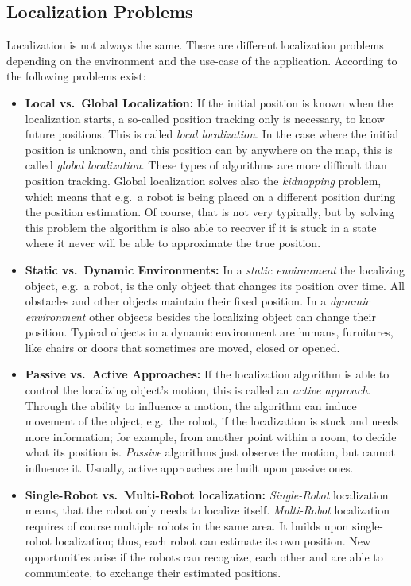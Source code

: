 \subsection{Localization Problems}
Localization is not always the same. There are different localization problems depending on the environment and the use-case of the application. According to \citet{thrun:prob_robo} the following problems exist:
\begin{itemize}
\item \textbf{Local vs.\ Global Localization:} If the initial position is known when the localization starts, a so-called position tracking only is necessary, to know future positions. This is called \emph{local localization}. In the case where the initial position is unknown, and this position can by anywhere on the map, this is called \emph{global localization}. These types of algorithms are more difficult than position tracking. Global localization solves also the \emph{kidnapping} problem, which means that e.g.\ a robot is being placed on a different position during the position estimation. Of course, that is not very typically, but by solving this problem the algorithm is also able to recover if it is stuck in a state where it never will be able to approximate the true position.

\item\textbf{Static vs.\ Dynamic Environments:} In a \emph{static environment} the localizing object, e.g.\ a robot, is the only object that changes its position over time. All obstacles and other objects maintain their fixed position. In a \emph{dynamic environment} other objects besides the localizing object can change their position. Typical objects in a dynamic environment are humans, furnitures, like chairs or doors that sometimes are moved, closed or opened.

\item\textbf{Passive vs.\ Active Approaches:} If the localization algorithm is able to control the localizing object's motion, this is called an \emph{active approach}. Through the ability to influence a motion, the algorithm can induce movement of the object, e.g.\ the robot, if the localization is stuck and needs more information; for example, from another point within a room, to decide what its position is. \emph{Passive} algorithms just observe the motion, but cannot influence it. Usually, active approaches are built upon passive ones.

\item\textbf{Single-Robot vs.\ Multi-Robot localization:} \emph{Single-Robot} localization means, that the robot only needs to localize itself. \emph{Multi-Robot} localization requires of course multiple robots in the same area. It builds upon single-robot localization; thus, each robot can estimate its own position. New opportunities arise if the robots can recognize, each other and are able to communicate, to exchange their estimated positions.
\end{itemize}

